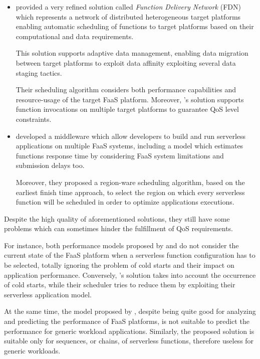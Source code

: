 \documentclass[12pt,a4paper]{report}
\begin{document}
\begin{itemize}
	\item \citet{NUOVODOCUMENTO} provided a very refined solution called \textit{Function Delivery Network} (FDN) which represents a network of distributed heterogeneous target platforms enabling automatic scheduling of functions to target platforms based on their computational and data requirements. 
	
	This solution supports adaptive data management, enabling data migration between target platforms to exploit data affinity exploiting several data staging tactics.
	
	Their scheduling algorithm considers both performance capabilities and resource-usage of the target FaaS platform. Moreover, \citet{NUOVODOCUMENTO}'s solution supports function invocations on multiple target platforms to guarantee QoS level constraints.
	
	\item \citet{xAFCL} developed a middleware which allow developers to build and run serverless applications on multiple FaaS systems, including a model which estimates functions response time by considering FaaS system limitations and submission delays too.
	
	Moreover, they proposed a region-ware scheduling algorithm, based on the earliest finish time approach, to select the region on which every serverless function will be scheduled in order to optimize applications executions.
	
	
\end{itemize}

Despite the high quality of aforementioned solutions, they still have some problems which can sometimes hinder the fulfillment of QoS requirements. 

For instance, both performance models proposed by \citet{COSE} and \citet{PMSCP} do not consider the current state of the FaaS platform when a serverless function configuration has to be selected, totally ignoring the problem of cold starts and their impact on application performance. Conversely, \citet{NUOVODOCUMENTO}'s solution takes into account the occurrence of cold starts, while their scheduler tries to reduce them by exploiting their serverless application model.

At the same time, the model proposed by \citet{Modelling}, despite being quite good for analyzing and predicting the performance of FaaS platforms, is not suitable to predict the performance for generic workload applications. Similarly, the \citet{COSE} proposed solution is suitable only for sequences, or chains, of serverless functions, therefore useless for generic workloads. 
\end{document}
